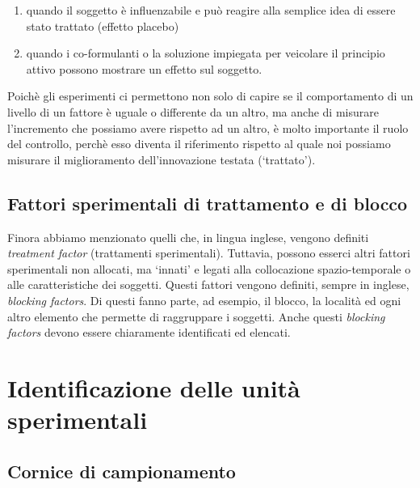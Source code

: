 \documentclass[a4paper,12pt,oneside]{book}
\providecommand{\tightlist}{%
  \setlength{\itemsep}{0pt}\setlength{\parskip}{0pt}}
\begin{document}
\begin{enumerate}
\def\labelenumi{\arabic{enumi}.}
\tightlist
\item
  quando il soggetto è influenzabile e può reagire alla semplice idea di essere stato trattato (effetto placebo)
\item
  quando i co-formulanti o la soluzione impiegata per veicolare il principio attivo possono mostrare un effetto sul soggetto.
\end{enumerate}

Poichè gli esperimenti ci permettono non solo di capire se il comportamento di un livello di un fattore è uguale o differente da un altro, ma anche di misurare l'incremento che possiamo avere rispetto ad un altro, è molto importante il ruolo del controllo, perchè esso diventa il riferimento rispetto al quale noi possiamo misurare il miglioramento dell'innovazione testata (`trattato').

\hypertarget{fattori-sperimentali-di-trattamento-e-di-blocco}{%
\subsection{Fattori sperimentali di trattamento e di blocco}\label{fattori-sperimentali-di-trattamento-e-di-blocco}}

Finora abbiamo menzionato quelli che, in lingua inglese, vengono definiti \emph{treatment factor} (trattamenti sperimentali). Tuttavia, possono esserci altri fattori sperimentali non allocati, ma `innati' e legati alla collocazione spazio-temporale o alle caratteristiche dei soggetti. Questi fattori vengono definiti, sempre in inglese, \emph{blocking factors}. Di questi fanno parte, ad esempio, il blocco, la località ed ogni altro elemento che permette di raggruppare i soggetti. Anche questi \emph{blocking factors} devono essere chiaramente identificati ed elencati.

\hypertarget{identificazione-delle-unita-sperimentali}{%
\section{Identificazione delle unità sperimentali}\label{identificazione-delle-unita-sperimentali}}

\hypertarget{cornice-di-campionamento}{%
\subsection{Cornice di campionamento}\label{cornice-di-campionamento}}
\end{document}
